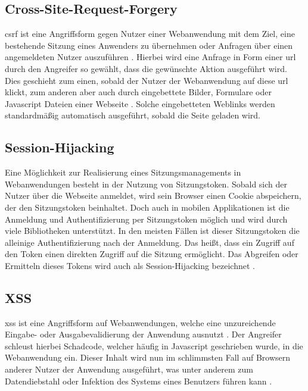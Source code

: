
\subsection{Cross-Site-Request-Forgery}
\gls{csrf} ist eine Angriffsform gegen Nutzer einer Webanwendung mit dem Ziel, eine bestehende Sitzung eines Anwenders zu übernehmen oder Anfragen über einen angemeldeten Nutzer auszuführen \cite[S.~83]{websecurity-book}.
Hierbei wird eine Anfrage in Form einer \gls{url} durch den Angreifer so gewählt, dass die gewünschte Aktion ausgeführt wird.
Dies geschieht zum einen, sobald der Nutzer der Webanwendung auf diese \gls{url} klickt, zum anderen aber auch durch eingebettete Bilder, Formulare oder Javascript Dateien einer Webseite \cite[S.~81]{websecurity-book}. Solche eingebetteten Weblinks werden standardmäßig automatisch ausgeführt, sobald die Seite geladen wird.

\subsection{Session-Hijacking}
Eine Möglichkeit zur Realisierung eines Sitzungsmanagements in Webanwendungen besteht in der Nutzung von Sitzungstoken.
Sobald sich der Nutzer über die Webseite anmeldet, wird sein Browser einen Cookie abspeichern, der den Sitzungstoken beinhaltet. Doch auch in mobilen Applikationen ist die Anmeldung und Authentifizierung per Sitzungstoken möglich und wird durch viele Bibliotheken unterstützt.
In den meisten Fällen ist dieser Sitzungstoken die alleinige Authentifizierung nach der Anmeldung.
Das heißt, dass ein Zugriff auf den Token einen direkten Zugriff auf die Sitzung ermöglicht.
Das Abgreifen oder Ermitteln dieses Tokens wird auch als Session-Hijacking bezeichnet  \cite[S.~89]{websecurity-book}.

\subsection{XSS}
\gls{xss} ist eine Angriffsform auf Webanwendungen, welche eine unzureichende Eingabe- oder Ausgabevalidierung der Anwendung ausnutzt \cite[S.~79]{websecurity-book}.
Der Angreifer schleust hierbei Schadcode, welcher häufig in Javascript geschrieben wurde, in die Webanwendung ein.
Dieser Inhalt wird nun im schlimmsten Fall auf Browsern anderer Nutzer der Anwendung ausgeführt, was unter anderem zum Datendiebstahl oder Infektion des Systems eines Benutzers führen kann \cite[S.~77]{websecurity-book}.

